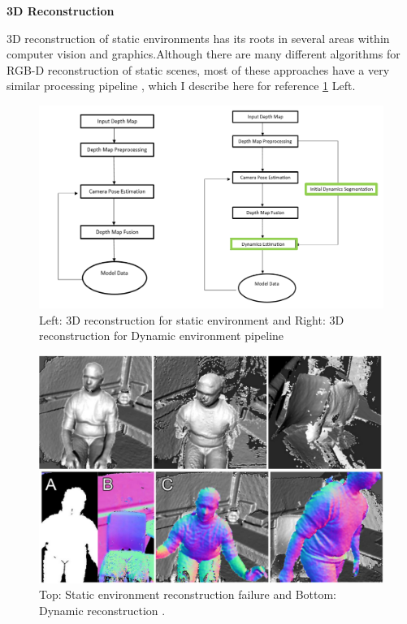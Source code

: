 \textbf{3D Reconstruction}


3D reconstruction of static environments has its roots in several areas within computer vision and graphics.Although there are many different algorithms for RGB-D reconstruction of static scenes, most of these approaches have a very similar processing pipeline \cite{Zollhofer2018}, which I describe here for reference \ref{fig:staticDynrec} Left.

\begin{figure}[h]
    \centering
    \includegraphics[scale=0.5]{images/Static_Dynamic_reco.PNG}
    \caption{Left: 3D reconstruction for static environment and Right: 3D reconstruction for Dynamic environment pipeline}
    \label{fig:staticDynrec}
\end{figure}

\begin{figure}[h]
    \centering
    \includegraphics[scale=0.5]{images/static_and_dynamic_failure.PNG}
    \caption{Top: Static environment reconstruction failure and Bottom: Dynamic reconstruction \cite{Keller:2013:RRD:2544744.2544784}.}
    \label{fig:staticfailure}
\end{figure}

